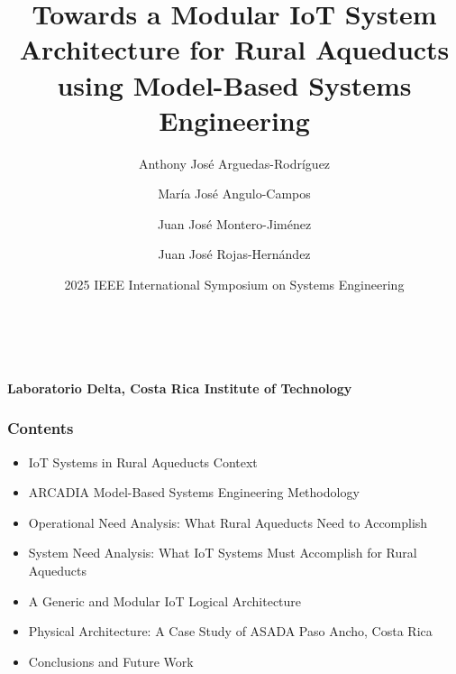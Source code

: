 \documentclass{beamer}
\title[IoT for Rural Aqueducts using MBSE]{Towards a Modular IoT System Architecture for Rural Aqueducts using Model-Based Systems Engineering}
\author[Laboratorio Delta]{Anthony José Arguedas-Rodríguez \and María José Angulo-Campos \and Juan José Montero-Jiménez \and Juan José Rojas-Hernández}
\date{2025 IEEE International Symposium on Systems Engineering}
\begin{document}
\begin{frame}
    \begin{center}
        {\LARGE \textbf{\inserttitle}} \\
        \vspace{0.5cm}
        {\insertauthor} \\
        \vspace{0.25cm}
        {\small \textbf{Laboratorio Delta, Costa Rica Institute of Technology}} \\
        \vspace{0.5cm}
        {\insertdate}
    \end{center}
\end{frame}

\begin{frame}
    \frametitle{Contents}
    \begin{itemize}
        \item IoT Systems in Rural Aqueducts Context
        \item ARCADIA Model-Based Systems Engineering Methodology
        \item Operational Need Analysis: What Rural Aqueducts Need to Accomplish
        \item System Need Analysis: What IoT Systems Must Accomplish for Rural Aqueducts
        \item A Generic and Modular IoT Logical Architecture
        \item Physical Architecture: A Case Study of ASADA Paso Ancho, Costa Rica
        \item Conclusions and Future Work
    \end{itemize}
\end{frame}
\end{document}
